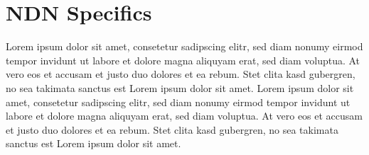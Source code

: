 \section{NDN Specifics}

Lorem ipsum dolor sit amet, consetetur sadipscing elitr, sed diam nonumy eirmod tempor invidunt ut labore et dolore magna aliquyam erat, sed diam voluptua. At vero eos et accusam et justo duo dolores et ea rebum. Stet clita kasd gubergren, no sea takimata sanctus est Lorem ipsum dolor sit amet. Lorem ipsum dolor sit amet, consetetur sadipscing elitr, sed diam nonumy eirmod tempor invidunt ut labore et dolore magna aliquyam erat, sed diam voluptua. At vero eos et accusam et justo duo dolores et ea rebum. Stet clita kasd gubergren, no sea takimata sanctus est Lorem ipsum dolor sit amet.


